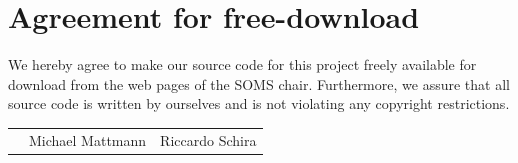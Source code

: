 \documentclass[11pt]{article}
\begin{document}

\newpage


\newpage
\section*{Agreement for free-download}
\bigskip


\bigskip


\large We hereby agree to make our source code for this project freely available for download from the web pages of the SOMS chair. Furthermore, we assure that all source code is written by ourselves and is not violating any copyright restrictions.

\begin{center}

\bigskip


\bigskip


\begin{tabular}{@{}p{3.3cm}@{}p{6cm}@{}@{}p{6cm}@{}}
\begin{minipage}{3cm}

\end{minipage}
&
\begin{minipage}{6cm}
\vspace{2mm} 

\large Michael Mattmann

 \vspace{\baselineskip}

\end{minipage}
&
\begin{minipage}{6cm}

\large Riccardo Schira

\end{minipage}
\end{tabular}


\end{center}
\newpage




\end{document}
